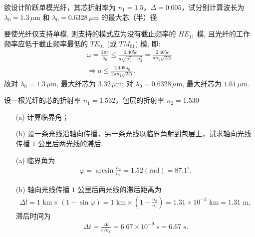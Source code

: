 \documentclass{assignment}
\begin{document}
\begin{prob}
    欲设计阶跃单模光纤，其芯折射率为 $n_1=1.5$，$\Delta=0.005$，试分别计算波长为 $\lambda_0=1.3\,\mu$m 和 $\lambda_0=0.6328\,\mu$m 的最大芯（半）径.
\end{prob}
\begin{sol}
    要使光纤仅支持单模, 则支持的模式应为没有截止频率的 $HE_{11}$ 模, 且光纤的工作频率应低于截止频率最低的 $TE_{01}$ (或 $TM_{01}$) 模, 即:
    \begin{gather}
        \omega=\frac{2\pi c}{\lambda_0}\leq\frac{2.405c}{a\sqrt{n_1^2-n_2^2}}=\frac{2.405c}{an_1\sqrt{2\Delta}}\\
        \Longrightarrow a\leq\frac{2.405\lambda_0}{2\pi n_1\sqrt{2\Delta}}.
    \end{gather}
    故对 $\lambda_0=1.3\,\mu$m, 最大纤芯为 $3.32\,\mu$m; 对 $\lambda_0=0.6328\,\mu$m, 最大纤芯为 $1.61\,\mu$m.
\end{sol}

\begin{prob}
    设一根光纤的芯的折射率 $n_1=1.532$，包层的折射率 $n_2=1.530$
    \begin{itemize}
        \item[(a)] 计算临界角；
        \item[(b)] 设一条光线沿轴向传播，另一条光线以临界角射到包层上，试求轴向光线传播 $1$ 公里后两光线的滞后.
    \end{itemize}
\end{prob}
\begin{sol}
    \begin{itemize}
        \item[(a)] 临界角为
        \begin{align}
            \varphi=\arcsin\frac{n_2}{n_1}=1.52(\text{rad})=87.1^{\circ}.
        \end{align}
        \item[(b)] 轴向光线传播 $1$ 公里后两光线的滞后距离为
        \begin{align}
            \Delta l=1\text{ km}\times(1-\sin\varphi)=1\text{ km}\times\left(1-\frac{n_2}{n_1}\right)=1.31\times 10^{-3}\text{ km}=1.31\text{ m},
        \end{align}
        滞后时间为
        \begin{align}
            \Delta t=\frac{\Delta l}{c/n_1}=6.67\times 10^{-9}\text{ s}=6.67\text{ s}.
        \end{align}
    \end{itemize}
\end{sol}
\end{document}

